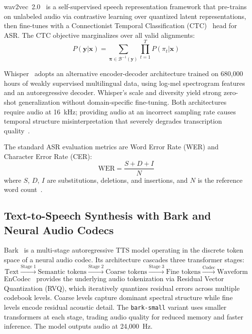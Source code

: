 \documentclass[conference]{IEEEtran}
\begin{document}
wav2vec~2.0~\cite{baevski2020wav2vec2} is a self-supervised speech representation framework that pre-trains on unlabeled audio via contrastive learning over quantized latent representations, then fine-tunes with a Connectionist Temporal Classification (CTC)~\cite{graves2006ctc} head for ASR. The CTC objective marginalizes over all valid alignments:
\begin{equation}
P(\mathbf{y} | \mathbf{x}) = \sum_{\boldsymbol{\pi} \in \mathcal{B}^{-1}(\mathbf{y})} \prod_{t=1}^{T} P(\pi_t | \mathbf{x})
\label{eq:ctc}
\end{equation}

Whisper~\cite{radford2023whisper} adopts an alternative encoder-decoder architecture trained on 680,000 hours of weakly supervised multilingual data, using log-mel spectrogram features and an autoregressive decoder. Whisper's scale and diversity yield strong zero-shot generalization without domain-specific fine-tuning. Both architectures require audio at 16~kHz; providing audio at an incorrect sampling rate causes temporal structure misinterpretation that severely degrades transcription quality~\cite{alammar2024}.

The standard ASR evaluation metrics are Word Error Rate (WER) and Character Error Rate (CER):
\begin{equation}
\text{WER} = \frac{S + D + I}{N}
\label{eq:wer}
\end{equation}
where \(S\), \(D\), \(I\) are substitutions, deletions, and insertions, and \(N\) is the reference word count~\cite{graves2006ctc}.

\subsection{Text-to-Speech Synthesis with Bark and Neural Audio Codecs}

Bark~\cite{bark2023} is a multi-stage autoregressive TTS model operating in the discrete token space of a neural audio codec. Its architecture cascades three transformer stages:
\[
\text{Text} \xrightarrow{\text{Stage 1}} \text{Semantic tokens} \xrightarrow{\text{Stage 2}} \text{Coarse tokens} \xrightarrow{\text{Stage 3}} \text{Fine tokens} \xrightarrow{\text{Codec}} \text{Waveform}
\]
EnCodec~\cite{defossez2022encodec} provides the underlying audio tokenization via Residual Vector Quantization (RVQ), which iteratively quantizes residual errors across multiple codebook levels. Coarse levels capture dominant spectral structure while fine levels encode residual acoustic detail. The \texttt{bark-small} variant uses smaller transformers at each stage, trading audio quality for reduced memory and faster inference. The model outputs audio at 24,000~Hz.
\end{document}
